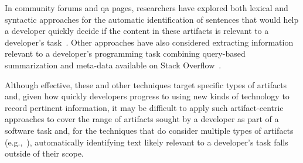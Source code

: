 In community forums and \acs{qa} pages, researchers have explored both lexical 
and syntactic approaches for the automatic identification of sentences that would 
help a developer quickly decide if the content in these artifacts is relevant to 
a developer's task~\cite{nadi2020}. Other approaches have also considered extracting information relevant to a developer's 
programming task combining query-based summarization 
and meta-data available on Stack Overflow~\cite{Xu2017, silva2019}.



Although effective, these and other techniques target specific
types of artifacts and, given 
how quickly developers progress to using new kinds of technology to
record pertinent information,
it may be difficult to apply such artifact-centric approaches to cover the range of
artifacts sought by a developer as part of a software task
and, for the techniques that do consider multiple types of artifacts (e.g.,~\cite{Ponzanelli2017}),
automatically identifying text likely relevant to a developer's task 
falls outside of their scope.


